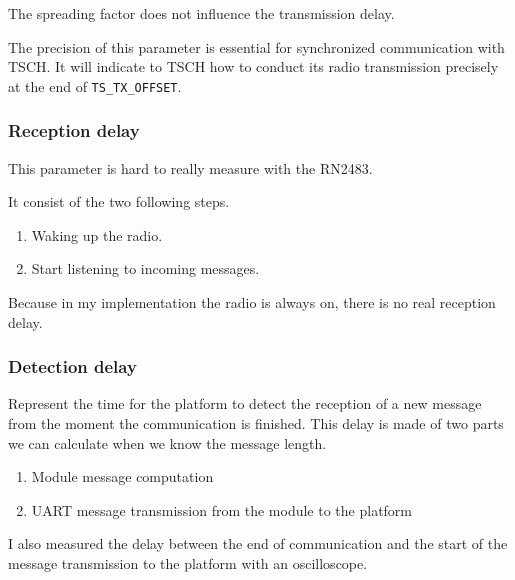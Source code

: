 The spreading factor does not influence the transmission delay.

The precision of this parameter is essential for synchronized communication
with TSCH. It will indicate to TSCH how to conduct its radio transmission
precisely at the end of \lstinline{TS_TX_OFFSET}.

\subsubsection{Reception delay}

This parameter is hard to really measure with the RN2483.

It consist of the two following steps.

\begin{enumerate}
  \item Waking up the radio.
  \item Start listening to incoming messages.
\end{enumerate}

Because in my implementation the radio is always on, there is no real reception
delay.

\subsubsection{Detection delay\label{section:detectiondelay}}


Represent the time for the platform to detect the reception of a new message
from the moment the communication is finished.
This delay is made of two parts we can calculate when we know the message
length.

\begin{enumerate}
  \item Module message computation
  \item UART message transmission from the module to the platform
\end{enumerate}

I also measured the delay between the end of communication and the start of the
message transmission to the platform with an oscilloscope.


